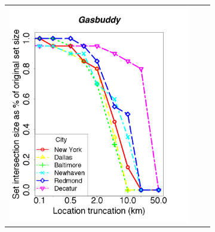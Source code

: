 \documentclass[10pt, conference, compsocconf]{IEEEtran}
\begin{document}
\begin{figure}[t!]
  \centering

  \begin{subfigure}{\textwidth}
  \begin{tabular}{ccc}
    
    \begin{minipage}{2in}
      \includegraphics[width=\textwidth]
                      {data/gasbuddy/plots/medians_across_city_si_20}
    \end{minipage}
    

\end{tabular}
\end{subfigure}
\end{figure}
\end{document}
